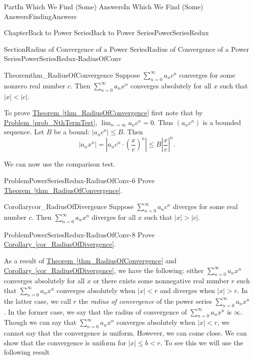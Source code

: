 \documentclass[oneside,10pt,]{book}
\newcommand{\xreffont}{\relax}
\numberwithin{equation}{part}
\newcommand{\abs}[1]{\left|#1\right|}
\def\limit#1#2#3{{\displaystyle\lim_{#1\rightarrow #2}#3}}
\newcommand{\lt}{<}
\begin{document}
\begin{partptx}{Part}{In Which We Find (Some) Answers}{}{In Which We Find (Some) Answers}{}{}{FindingAnswers}
\begin{chapterptx}{Chapter}{Back to Power Series}{}{Back to Power Series}{}{}{PowerSeriesRedux}
\begin{sectionptx}{Section}{Radius of Convergence of a Power Series}{}{Radius of Convergence of a Power Series}{}{}{PowerSeriesRedux-RadiusOfConv}
\begin{theorem}{Theorem}{}{}{thm_RadiusOfConvergence}
 Suppose \(\sum_{n=0}^\infty a_nc^n\) converges for some nonzero real number \(c\).  Then \(\sum_{n=0}^\infty
a_nx^n\) converges absolutely for all \(x\) such that \(|x|\lt |c|\).%
\end{theorem}
To prove \hyperref[thm_RadiusOfConvergence]{Theorem~{\xreffont\ref{thm_RadiusOfConvergence}}} first note that by \hyperref[prob_NthTermTest]{Problem~{\xreffont\ref{prob_NthTermTest}}}, \(\limit{n}{\infty}{a_nc^n}=0\).  Thus \(\left(a_nc^n\right)\) is a bounded sequence.  Let \(B\) be a bound: \(\abs{a_nc^n}\le B\).  Then%
\begin{equation*}
\abs{a_nx^n}=\abs{a_nc^n\cdot\left(\frac{x}{c}\right)^n}\leq B\abs{\frac{x}{c}}^n\text{.}
\end{equation*}
%
\par
We can now use the comparison test.%
\begin{problem}{Problem}{}{PowerSeriesRedux-RadiusOfConv-6}%
 Prove \hyperref[thm_RadiusOfConvergence]{Theorem~{\xreffont\ref{thm_RadiusOfConvergence}}}.%
\end{problem}
\begin{corollary}{Corollary}{}{}{cor_RadiusOfDivergence}%
Suppose \(\sum_{n=0}^\infty a_nc^n\) diverges for some real number \(c\).  Then \(\sum_{n=0}^\infty a_nx^n\) diverges for all \(x\) such that \(|x|>|c|\).%
\end{corollary}
\begin{problem}{Problem}{}{PowerSeriesRedux-RadiusOfConv-8}%
 Prove \hyperref[cor_RadiusOfDivergence]{Corollary~{\xreffont\ref{cor_RadiusOfDivergence}}}.%
\end{problem}
As a result of \hyperref[thm_RadiusOfConvergence]{Theorem~{\xreffont\ref{thm_RadiusOfConvergence}}} and \hyperref[cor_RadiusOfDivergence]{Corollary~{\xreffont\ref{cor_RadiusOfDivergence}}}, we have the following: either \(\sum_{n=0}^\infty a_nx^n\) converges absolutely for all \(x\) or there exists some nonnegative real number \(r\) such that \(\sum_{n=0}^\infty a_nx^n\) converges absolutely when \(|x|\lt r\) and diverges when \(|x|>r\).  In the latter case, we call \(r\) the \emph{radius of convergence} of the power series \(\sum_{n=0}^{\infty}a_{n} x^{n}\).  In the former case, we say that the radius of convergence of \(\sum_{n=0}^\infty
a_nx^n\) is \(\infty\).  Though we can say that \(\sum_{n=0}^\infty a_nx^n\) converges absolutely when \(|x|\lt r\), we cannot say that the convergence is uniform. However, we can come close.  We can show that the convergence is uniform for \(|x|\leq b\lt r\).  To see this we will use the following result%

\end{sectionptx}
\end{chapterptx}
\end{partptx}
\end{document}
